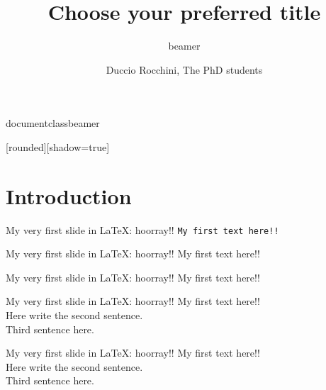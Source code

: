 documentclass{beamer}
\usepackage{listings}
% 
[rounded][shadow=true]
% 

\title{Choose your preferred title}
 \subtitle{beamer}
 \author{Duccio Rocchini, The PhD students}


\maketitle


\section{Introduction}

\begin{frame}{My very first slide in LaTeX: hoorray!!}
    \texttt{My first text here!!}
\end{frame}

\begin{frame}{My very first slide in LaTeX: hoorray!!}
    \scriptsize{My first text here!!}
\end{frame}

\begin{frame}{My very first slide in LaTeX: hoorray!!}
    \tiny{My first text here!!}
\end{frame}



\begin{frame}{My very first slide in LaTeX: hoorray!!}
    My first text here!! \\
    Here write the second sentence. \\
    Third sentence here.
\end{frame}


\begin{frame}{My very first slide in LaTeX: hoorray!!}
    My first text here!! \\
    \bigskip
    Here write the second sentence. \\
    \bigskip
    Third sentence here.
\end{frame}

